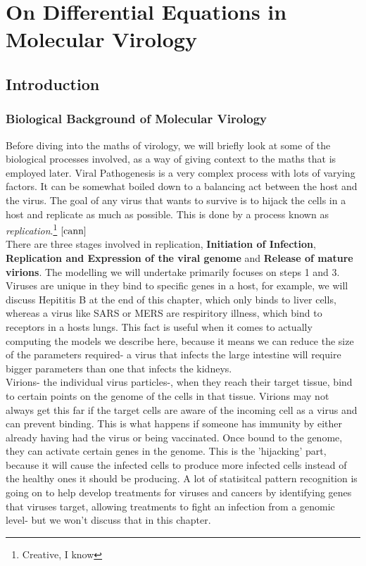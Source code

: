 \chapter{On Differential Equations in Molecular Virology}

\section{Introduction}

\subsection{Biological Background of Molecular Virology}

Before diving into the maths of virology, we will briefly look at some of the biological processes involved, as a way of giving context to the maths that is employed later. Viral Pathogenesis is a very complex process with lots of varying factors. It can be somewhat boiled down to a balancing act between the host and the virus. The goal of any virus that wants to survive is to hijack the cells in a host and replicate as much as possible. This is done by a process known as \textit{replication}.\footnote{Creative, I know} $\cite{cann}$ \\

There are three stages involved in replication, \textbf{Initiation of Infection}, \textbf{Replication and Expression of the viral genome} and  \textbf{Release of mature virions}. The modelling we will undertake primarily focuses on steps 1 and 3. \\

Viruses are unique in they bind to specific genes in a host, for example, we will discuss Hepititis B at the end of this chapter, which only binds to liver cells, whereas a virus like SARS or MERS are respiritory illness, which bind to receptors in a hosts lungs. This fact is useful when it comes to actually computing the models we describe here, because it means we can reduce the size of the parameters required- a virus that infects the large intestine will require bigger parameters than one that infects the kidneys. \\

Virions- the individual virus particles-, when they reach their target tissue, bind to certain points on the genome of the cells in that tissue. Virions may not always get this far if the target cells are aware of the incoming cell as a virus and can prevent binding. This is what happens if someone has immunity by either already having had the virus or being vaccinated. Once bound to the genome, they can activate certain genes in the genome. This is the 'hijacking' part, because it will cause the infected cells to produce more infected cells instead of the healthy ones it should be producing. A lot of statisitcal pattern recognition is going on to help develop treatments for viruses and cancers by identifying genes that viruses target, allowing treatments to fight an infection from a genomic level- but we won't discuss that in this chapter. \\

